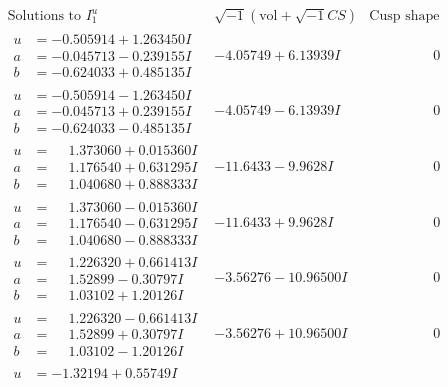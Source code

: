 \documentclass[1p]{elsarticle_modified}
\theoremstyle{definition}
\newcommand{\I}{\sqrt{-1}}
\begin{document}
$$\begin{array}{c|c|c}
\text{Solutions to }I^u_{1}& \I (\text{vol} + \sqrt{-1}CS) & \text{Cusp shape}\\
 \hline 
\begin{aligned}
u &= -0.505914 + 1.263450 I \\
a &= -0.045713 - 0.239155 I \\
b &= -0.624033 + 0.485135 I\end{aligned}
 & -4.05749 + 6.13939 I & \phantom{-0.000000 } 0 \\ \hline\begin{aligned}
u &= -0.505914 - 1.263450 I \\
a &= -0.045713 + 0.239155 I \\
b &= -0.624033 - 0.485135 I\end{aligned}
 & -4.05749 - 6.13939 I & \phantom{-0.000000 } 0 \\ \hline\begin{aligned}
u &= \phantom{-}1.373060 + 0.015360 I \\
a &= \phantom{-}1.176540 + 0.631295 I \\
b &= \phantom{-}1.040680 + 0.888333 I\end{aligned}
 & -11.6433 - 9.9628 I & \phantom{-0.000000 } 0 \\ \hline\begin{aligned}
u &= \phantom{-}1.373060 - 0.015360 I \\
a &= \phantom{-}1.176540 - 0.631295 I \\
b &= \phantom{-}1.040680 - 0.888333 I\end{aligned}
 & -11.6433 + 9.9628 I & \phantom{-0.000000 } 0 \\ \hline\begin{aligned}
u &= \phantom{-}1.226320 + 0.661413 I \\
a &= \phantom{-}1.52899 - 0.30797 I \\
b &= \phantom{-}1.03102 + 1.20126 I\end{aligned}
 & -3.56276 - 10.96500 I & \phantom{-0.000000 } 0 \\ \hline\begin{aligned}
u &= \phantom{-}1.226320 - 0.661413 I \\
a &= \phantom{-}1.52899 + 0.30797 I \\
b &= \phantom{-}1.03102 - 1.20126 I\end{aligned}
 & -3.56276 + 10.96500 I & \phantom{-0.000000 } 0 \\ \hline\begin{aligned}
u &= -1.32194 + 0.55749 I \\

\end{aligned}
\end{array}$$
\end{document}

